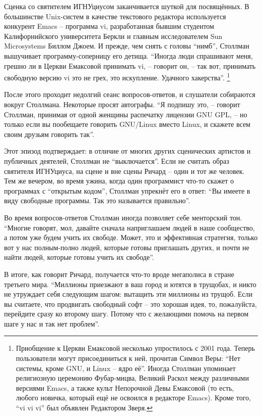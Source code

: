 Сценка со святителем ИГНУциусом заканчивается шуткой для посвящённых. В большинстве Unix-систем в качестве текстового редактора используется конкурент Emacs -- программа vi, разработанная бывшим студентом Калифорнийского университета Беркли и главным исследователем Sun Microsystems Биллом Джоем. И прежде, чем снять с головы \enquote{нимб}, Столлман вышучивает программу-соперницу его детища. \enquote{Иногда люди спрашивают меня, грешно ли в Церкви Емаксовой принимать vi, -- говорит он, -- так вот, принимать свободную версию vi это не грех, это искупление. Удачного хакерства}. \footnote{Приобщение к Церкви Емаксовой несколько упростилось с 2001 года. Теперь пользователи могут присоединиться к ней, прочитав Символ Веры: \enquote{Нет системы, кроме GNU, и Linux -- ядро её}. Иногда Столлман упоминает религиозную церемонию Фубар-мицва, Великий Раскол между различными версиями Emacs, а также культ Непорочной Девы Емаксовой (то есть, любого новичка, который ещё не освоился в редакторе Emacs). Кроме того, \enquote{vi vi vi} был объявлен Редактором Зверя.}

После этого проходит недолгий сеанс вопросов-ответов, и слушатели собираются вокруг Столлмана. Некоторые просят автографы. \enquote{Я подпишу это, -- говорит Столлман, принимая от одной женщины распечатку лицензии GNU GPL, -- но только если вы пообещаете говорить GNU/Linux вместо Linux, и скажете всем своим друзьям говорить так}.

Этот эпизод подтверждает: в отличие от многих других сценических артистов и публичных деятелей, Столлман не \enquote{выключается}. Если не считать образ святителя ИГНУциуса, на сцене и вне сцены Ричард -- один и тот же человек. Тем же вечером, во время ужина, когда один программист что-то скажет о программах с \enquote{открытым кодом}, Столлман упрекнёт его в ответ: \enquote{Вы имеете в виду свободные программы. Так это называется правильно}.

Во время вопросов-ответов Столлман иногда позволяет себе менторский тон. \enquote{Многие говорят, мол, давайте сначала наприглашаем людей в наше сообщество, а потом уже будем учить их свободе. Может, это и эффективная стратегия, только вот у нас полным-полно людей, которые готовы приглашать других, и почти не найти людей, которые готовы учить их свободе}.

В итоге, как говорит Ричард, получается что-то вроде мегаполиса в стране третьего мира. \enquote{Миллионы приезжают в ваш город и ютятся в трущобах, и никто не утруждает себя следующим шагом: вытащить эти миллионы из трущоб. Если вы считаете, что продвигать свободный софт -- это хорошая идея, то, пожалуйста, перейдите сразу ко второму шагу. Потому что с желающими помочь на первом шаге у нас и так нет проблем}.

